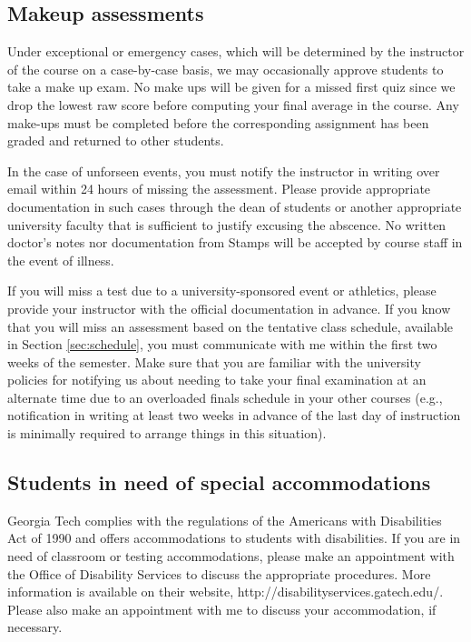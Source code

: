 \documentclass[11pt]{article}
\begin{document}
    \subsection{Makeup assessments}
Under exceptional or emergency cases, which will be determined by the instructor of the course on a case-by-case basis, 
we may occasionally approve students to take a make up exam. No make ups will be given for a missed first quiz 
since we drop the lowest raw score before computing your final average in the course. 
Any make-ups must be completed before the corresponding assignment has been graded and
returned to other students. 

In the case of unforseen events, you must notify the instructor in writing over email within 24 
hours of missing the assessment. Please provide appropriate documentation in such cases through the dean of students 
or another appropriate university faculty that is sufficient to justify excusing the abscence. 
No written doctor's notes nor documentation from Stamps will be accepted by course staff in the event of illness.

If you will miss a test due to a university-sponsored event or athletics, please
provide your instructor with the official documentation in advance.    
    If you know that you will miss an assessment based on the tentative class schedule, available in Section \ref{sec:schedule}, you must communicate with me within the first two weeks of the semester. 
Make sure that you are familiar with the university policies for notifying us about needing to take your 
final examination at an alternate time due to an overloaded finals schedule in your other courses 
(e.g., notification in writing at least two weeks in advance of the last day of instruction is 
minimally required to arrange things in this situation). 
    
    \subsection{Students in need of special accommodations}
    
    Georgia Tech complies with the regulations of the Americans with Disabilities Act of 1990 and offers accommodations to students with disabilities. If you are in need of classroom or testing accommodations, please make an appointment with the Office of Disability Services to discuss the appropriate procedures. More information is available on their website, http://disabilityservices.gatech.edu/. Please also make an appointment with me to discuss your accommodation, if necessary.
\end{document}
